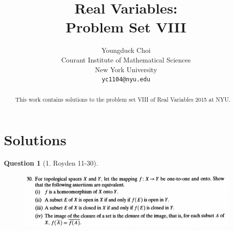 \documentclass{article} %
\title{Real Variables: \\
Problem Set VIII}
\author{
Youngduck Choi \\
Courant Institute of Mathematical Sciences \\
New York University \\
\texttt{yc1104@nyu.edu} \\
}
\theoremstyle{quest}
\newtheorem*{question}{Question}
\begin{document}
\maketitle

\begin{abstract}
This work contains solutions to the problem set 
VIII of Real Variables 2015 at NYU.
\end{abstract}

\section{Solutions}

\begin{question}[1. Royden 11-30]
\hfill
\begin{figure}[h!]
  \centering
    \includegraphics[width=1\textwidth]{11-30}
\end{figure}
\end{question}
\end{document}
